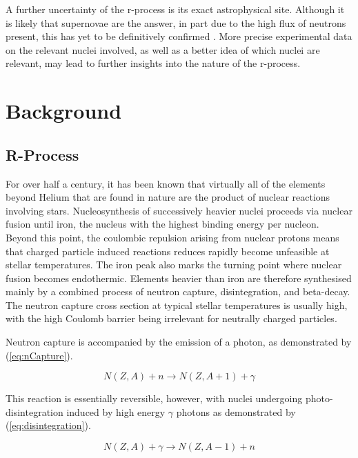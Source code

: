\documentclass[a4paper,12pt]{article}
\begin{document}
A further uncertainty of the r-process is its exact astrophysical site. Although it is likely that supernovae are the answer, in part due to the high flux of neutrons present, this has yet to be definitively confirmed \cite{thielemann}{}. More precise experimental data on the relevant nuclei involved, as well as a better idea of which nuclei are relevant, may lead to further insights into the nature of the r-process.


\section{Background}
\subsection{R-Process}
For over half a century, it has been known that virtually all of the elements beyond Helium that are found in nature are the product of nuclear reactions involving stars. Nucleosynthesis of successively heavier nuclei proceeds via nuclear fusion until iron, the nucleus with the highest binding energy per nucleon. Beyond this point, the coulombic repulsion arising from nuclear protons means that charged particle induced reactions reduces rapidly become unfeasible at stellar temperatures\cite{iliadis}{}. The iron peak also marks the turning point where nuclear fusion becomes endothermic. Elements heavier than iron are therefore synthesised mainly by a combined process of neutron capture, disintegration, and beta-decay\cite{b2fh}{}. The neutron capture cross section at typical stellar temperatures is usually high, with the high Coulomb barrier being irrelevant for neutrally charged particles\cite{iliadis}{}. 

Neutron capture is accompanied by the emission of a photon, as demonstrated by (\ref{eq:nCapture}).

\begin{equation}
\label{eq:nCapture}
N(Z, A) + n \rightarrow N(Z, A+1) + \gamma
\end{equation}

This reaction is essentially reversible, however, with nuclei undergoing photo-disintegration induced by high energy $\gamma$ photons as demonstrated by (\ref{eq:disintegration}).

\begin{equation}
\label{eq:disintegration}
N(Z, A) + \gamma \rightarrow N(Z, A-1) + n 
\end{equation}
\end{document}
